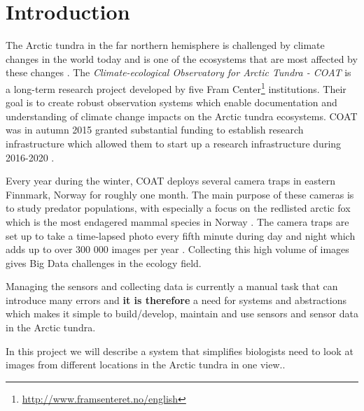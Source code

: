 \documentclass[USenglish]{uit-thesis}
\begin{document}
\mainmatter

\chapter{Introduction}
The Arctic tundra in the far northern hemisphere is challenged by climate changes in the world today and is one of the ecosystems that are most affected by these changes \cite{coat2016}. The \textit{Climate-ecological Observatory for Arctic Tundra - COAT} is a long-term research project developed by five Fram Center\footnote{\url{http://www.framsenteret.no/english}} institutions. Their goal is to create robust observation systems which enable documentation and understanding of climate change impacts on the Arctic tundra ecosystems. COAT was in autumn 2015 granted substantial funding to establish research infrastructure which allowed them to start up a research infrastructure during 2016-2020 \cite{coat2016}. 

Every year during the winter, COAT deploys several camera traps in eastern Finnmark, Norway for roughly one month. The main purpose of these cameras is to study predator populations, with especially a focus on the redlisted arctic fox which is the most endagered mammal species in Norway  \cite{coatplan2016}. 
The camera traps are set up to take a time-lapsed photo every fifth minute during day and night which adds up to over 300 000 images per year \cite{methodseco}. Collecting this high volume of images gives Big Data challenges in the ecology field. 

Managing the sensors and collecting data is currently a manual task that can introduce many errors and \textbf{it is therefore} a need for systems and abstractions which makes it simple to build/develop, maintain and use sensors and sensor data in the Arctic tundra. 



In this project we will describe a system that simplifies biologists need  to look at images from different locations in the Arctic tundra in one view..
\end{document}
